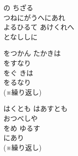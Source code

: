 ﻿\documentclass[10pt,a5j]{tarticle} %
\begin{document}
\vspace{1.5em}
\begin{enumerate}
	\begin{minipage}[c]{\blocksize}
	
		\vspace{\linespace}
		\item
		の
		ちざる\\
		つねにがうへにあれ\\
		よるひるて
		あけくれへ\\
		となししに\\

	\end{minipage}
	\begin{minipage}[c]{\blocksize}

		\vspace{\linespace}
		\item
		をつかん
		たかきは\\
		をすなり\\
		をぐ
		きは\\
		をるなり\\
		(※繰り返し)
	
	\end{minipage}
	\begin{minipage}[c]{\blocksize}
		
		\vspace{\linespace}
		\item
		はくとも
		はあすとも\\
		おつべしや\\
		をめ
		ゆるす\\
		にあり\\
		(※繰り返し)
	

\end{minipage}
\end{enumerate}
\end{document}
